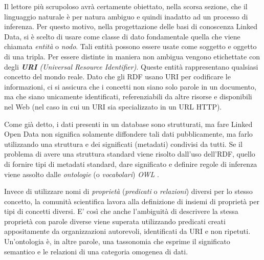 Il lettore più scrupoloso avrà certamente obiettato, nella scorsa sezione, che il linguaggio naturale è per natura ambiguo e quindi inadatto ad un processo di inferenza. Per questo motivo, nella progettazione delle basi di conoscenza Linked Data, si è scelto di usare come classe di dato fondamentale quella che viene chiamata \textit{entità} o \textit{nodo}. Tali entità possono essere usate come soggetto e oggetto di una tripla. Per essere distinte in maniera non ambigua vengono etichettate con degli \textit{\textbf{URI} (Universal Resource Identifier)}. 
Queste entità rappresentano qualsiasi concetto del mondo reale. 
Dato che gli RDF usano URI per codificare le informazioni, ci si assicura che i concetti non siano solo parole in un documento, ma che siano unicamente identificati, referenziabili da altre risorse e disponibili nel Web (nel caso in cui un URI sia specializzato in un URL HTTP). 

Come già detto, i dati presenti in un database sono strutturati, ma fare Linked Open Data non significa solamente diffondere tali dati pubblicamente, ma farlo utilizzando una struttura e dei significati (metadati) condivisi da tutti. Se il problema di avere una struttura standard viene risolto dall'uso dell'RDF, quello di fornire tipi di metadati standard, dare significato e definire regole di inferenza viene assolto dalle \textit{ontologie} (o \textit{vocabolari}) \textit{OWL} \cite{w3c_owl}. 

Invece di utilizzare nomi di \textit{proprietà} (\textit{predicati} o \textit{relazioni}) diversi per lo stesso concetto, la comunità scientifica lavora alla definizione di insiemi di proprietà per tipi di concetti diversi. E' così che anche l'ambiguità di descrivere la stessa proprietà con parole diverse viene superata utilizzando predicati creati appositamente da organizzazioni autorevoli, identificati da URI e non ripetuti. Un'ontologia è, in altre parole, una tassonomia che esprime il significato semantico e le relazioni di una categoria omogenea di dati.

